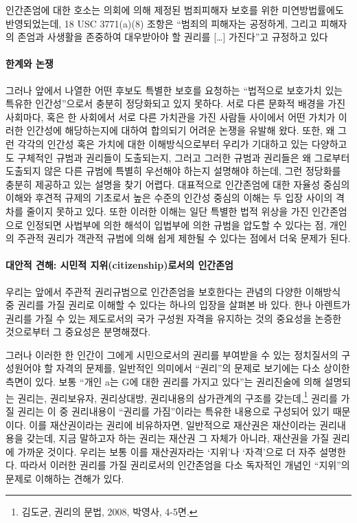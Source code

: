 인간존엄에 대한 호소는 의회에 의해 제정된 범죄피해자 보호를 위한 미연방법률에도 반영되었는데, 18 USC 3771(a)(8) 조항은 ``범죄의 피해자는 공정하게, 그리고 피해자의 존엄과 사생활을 존중하여 대우받아야 할 권리를 {[}\ldots{]} 가진다''고 규정하고 있다

\paragraph{한계와 논쟁}

그러나 앞에서 나열한 어떤 후보도 특별한 보호를 요청하는 ``법적으로 보호가치 있는 특유한 인간성''으로서 충분히 정당화되고 있지 못하다. 서로 다른 문화적 배경을 가진 사회마다, 혹은 한 사회에서 서로 다른 가치관을 가진 사람들 사이에서 어떤 가치가 이러한 인간성에 해당하는지에 대하여 합의되기 어려운 논쟁을 유발해 왔다. 또한, 왜 그런 각각의 인간성 혹은 가치에 대한 이해방식으로부터 우리가 기대하고 있는 다양하고도 구체적인 규범과 권리들이 도출되는지, 그러고 그러한 규범과 권리들은 왜 그로부터 도출되지 않은 다른 규범에 특별히 우선해야 하는지 설명해야 하는데, 그런 정당화를 충분히 제공하고 있는 설명을 찾기 어렵다. 대표적으로 인간존엄에 대한 자율성 중심의 이해와 후견적 규제의 기초로서 높은 수준의 인간성 중심의 이해는 두 입장 사이의 격차를 줄이지 못하고 있다. 또한 이러한 이해는 일단 특별한 법적 위상을 가진 인간존엄으로 인정되면 사법부에 의한 해석이 입법부에 의한 규범을 압도할 수 있다는 점, 개인의 주관적 권리가 객관적 규범에 의해 쉽게 제한될 수 있다는 점에서 더욱 문제가 된다.

\paragraph{대안적 견해: 시민적 지위(citizenship)로서의 인간존엄}

우리는 앞에서 주관적 권리규범으로 인간존엄을 보호한다는 관념의 다양한 이해방식 중 권리를 가질 권리로 이해할 수 있다는 하나의 입장을 살펴본 바 있다. 한나 아렌트가 권리를 가질 수 있는 제도로서의 국가 구성원 자격을 유지하는 것의 중요성을 논증한 것으로부터 그 중요성은 분명해졌다.

그러나 이러한 한 인간이 그에게 시민으로서의 권리를 부여받을 수 있는 정치질서의 구성원어야 할 자격의 문제를, 일반적인 의미에서 ``권리''의 문제로 보기에는 다소 상이한 측면이 있다. 보통 ``개인 a는 G에 대한 권리를 가지고 있다''는 권리진술에 의해 설명되는 권리는, 권리보유자, 권리상대방, 권리내용의 삼가관계의 구조를 갖는데,\footnote{김도균, 권리의 문법, 2008, 박영사, 4-5면.} 권리를 가질 권리는 이 중 권리내용이 ``권리를 가짐''이라는 특유한 내용으로 구성되어 있기 때문이다. 이를 재산권이라는 권리에 비유하자면, 일반적으로 재산권은 재산이라는 권리내용을 갖는데, 지금 말하고자 하는 권리는 재산권 그 자체가 아니라, 재산권을 가질 권리에 가까운 것이다. 우리는 보통 이를 재산권자라는 `지위'나 `자격'으로 더 자주 설명한다. 따라서 이러한 권리를 가질 권리로서의 인간존엄을 다소 독자적인 개념인 ``지위''의 문제로 이해하는 견해가 있다.

